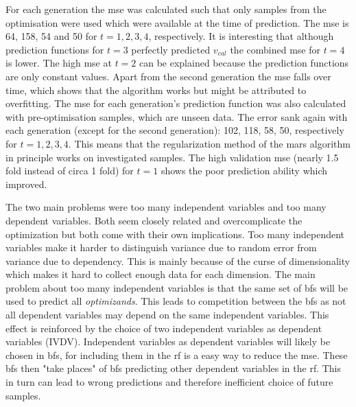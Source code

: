 For each generation the \gls{mse} was calculated such that only samples 
from the optimisation were used which were available at the time of prediction. 
The \gls{mse} is 64, 158, 54 and 50 for $t=1,2,3,4$, respectively. 
It is interesting that although prediction functions for $t=3$ perfectly predicted $v_{cal}$ 
the combined \gls{mse} for $t=4$ is lower. 
The high \gls{mse} at $t=2$ can be explained because the prediction functions are only constant values. 
Apart from the second generation the \gls{mse} falls over time, which shows that the algorithm works but might be attributed to overfitting.
The \gls{mse} for each generation's prediction function was also calculated with pre-optimisation samples, which are unseen data. 
The error sank again with each generation (except for the second generation): 102, 118, 58, 50, respectively for $t=1,2,3,4$. 
This means that the regularization method of the \gls{mars} algorithm in principle works on investigated samples. 
The high validation \gls{mse} (nearly 1.5 fold instead of circa 1 fold) for $t=1$ shows the poor prediction ability which improved.

The two main problems were too many independent variables and too many dependent variables. 
Both seem closely related and overcomplicate the optimization but both come with their own implications. 
Too many independent variables make it harder to distinguish variance due to random error from variance due to dependency. 
This is mainly because of the curse of dimensionality  which makes it hard to collect enough data for each dimension. 
The main problem about too many independent variables is that the same set of \gls{bf}s will be used to predict all \textit{optimizands}.
This leads to competition between the \gls{bf}s as not all dependent variables may depend on the same independent variables. 
This effect is reinforced by the choice of two independent variables as dependent variables (IVDV). 
Independent variables as dependent variables will likely be chosen in \gls{bf}s, 
for including them in the \gls{rf} is a easy way to reduce the \gls{mse}.
These \gls{bf}s then "take places"  of \gls{bf}s predicting other dependent variables in the \gls{rf}. 
This in turn can lead to wrong predictions and therefore inefficient choice of future samples. 


